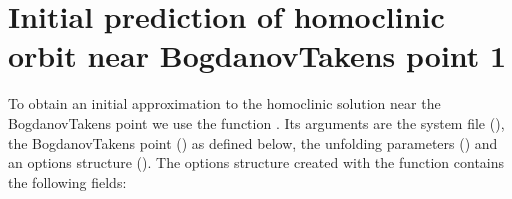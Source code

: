 \documentclass[letterpaper,10pt,english]{jupyterBook}
\begin{document}
\section{Initial prediction of homoclinic orbit near Bogdanov\sphinxhyphen{}Takens point 1}
\label{\detokenize{Morris-Lecar:initial-prediction-of-homoclinic-orbit-near-bogdanov-takens-point-1}}\label{\detokenize{Morris-Lecar:initial-prediction-homoclinic-orbit}}
\sphinxAtStartPar
To obtain an initial approximation to the homoclinic solution near the
Bogdanov\sphinxhyphen{}Takens point we use the function . Its arguments are the
system file (), the Bogdanov\sphinxhyphen{}Takens point () as defined below, the
unfolding parameters () and an options structure (). The options
structure created with the function  contains the following
fields:
\end{document}
